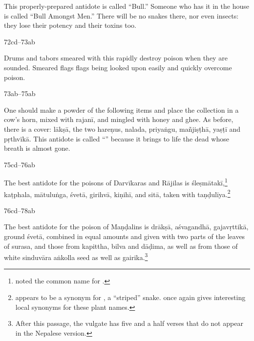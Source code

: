 \begin{translation}
\begin{sloka}
This properly-prepared antidote is called “Bull.” Someone who 
has it in the house is called “Bull Amongst Men.”  
There will be no snakes there, nor even insects: they lose their potency and 
their toxins too. 
\end{sloka}

\item [72cd--73ab]

\begin{sloka}
Drums and tabors smeared with
this rapidly destroy poison when they are sounded.
Smeared flags flags being looked upon easily and quickly
overcome poison.
\end{sloka}

\item [73ab--75ab] 

\begin{sloka}
    One should make a powder of the following items and
place the collection in a cow's horn, mixed with \gls{rajanī}, and mingled with 
honey and ghee.  As before, there is a cover: \gls{lākṣā},
    the two \glspl{hareṇu}, \gls{nalada}, \gls{priyaṅgu}, \gls{mañjiṣṭhā},
    \gls{yaṣṭī} and \gls{pṛthvīkā}. 
        This antidote is
    called “” because it  brings to life the 
    dead whose breath is almost gone.
\end{sloka}
\item [75cd--76ab]

\begin{sloka}
    The best antidote for the poisons of Darvīkaras and Rājilas is
\gls{śleṣmātakī},\footnote{ noted the common name
     for .}
\gls{kaṭphala},
\gls{mātuluṅga},
\gls{śvetā}, %
\gls{girihvā}, %
\gls{kiṇihī},
and \gls{sitā}, 
taken with \gls{taṇḍulīya}.\footnote{ appears to be a synonym
    for , a “striped” snake.  once 
    again gives interesting local synonyms for these plant names.}
\end{sloka}

\item[76cd--78ab]

\begin{sloka}
    The best antidote for the poison of Maṇḍalins is
\gls{drākṣā},
\gls{aśvagandhā},
\gls{gajavṛttikā},
ground \gls{śvetā},
combined in equal amounts and given with 
two parts of the leaves of 
\gls{surasa}, and those from
\gls{kapittha},
\gls{bilva} 
and 
\gls{dāḍima}, 
as well as  from those of
white \gls{sinduvāra}
\gls{aṅkolla} seed
as well as 
\gls{gairika}.\footnote{After this passage, the vulgate has five and a half verses
    that do not appear in the Nepalese version.}
\end{sloka}


\end{translation}
